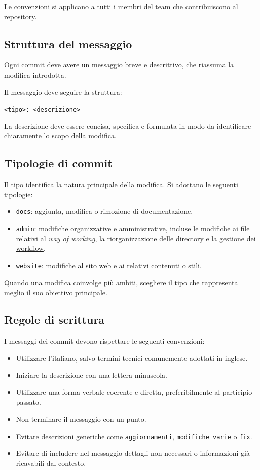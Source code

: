 \documentclass[11pt, a4paper]{article}
\begin{document}
Le convenzioni si applicano a tutti i membri del team che contribuiscono al repository.

\subsection{Struttura del messaggio}

Ogni commit deve avere un messaggio breve e descrittivo, che riassuma la modifica introdotta.

Il messaggio deve seguire la struttura:

\noindent \texttt{<tipo>: <descrizione>}

La descrizione deve essere concisa, specifica e formulata in modo da identificare chiaramente lo scopo della modifica.

\subsection{Tipologie di commit}

Il tipo identifica la natura principale della modifica. Si adottano le seguenti tipologie:
\begin{itemize}
    \item \texttt{docs}: aggiunta, modifica o rimozione di documentazione.
    \item \texttt{admin}: modifiche organizzative e amministrative, incluse le modifiche ai file relativi al \textit{way of working}, la riorganizzazione delle directory e la gestione dei \href{https://github.com/On-By-One-Team/On-By-One.github.io/blob/main/.github/workflows}{workflow}.
    \item \texttt{website}: modifiche al \href{https://on-by-one-team.github.io/On-By-One.github.io/}{sito web} e ai relativi contenuti o stili.
\end{itemize}

\noindent Quando una modifica coinvolge più ambiti, scegliere il tipo che rappresenta meglio il suo obiettivo principale.

\subsection{Regole di scrittura}

I messaggi dei commit devono rispettare le seguenti convenzioni:
\begin{itemize}
    \item Utilizzare l'italiano, salvo termini tecnici comunemente adottati in inglese.
    \item Iniziare la descrizione con una lettera minuscola.
    \item Utilizzare una forma verbale coerente e diretta, preferibilmente al participio passato.
    \item Non terminare il messaggio con un punto.
    \item Evitare descrizioni generiche come \texttt{aggiornamenti}, \texttt{modifiche varie} o \texttt{fix}.
    \item Evitare di includere nel messaggio dettagli non necessari o informazioni già ricavabili dal contesto.
\end{itemize}
\end{document}
